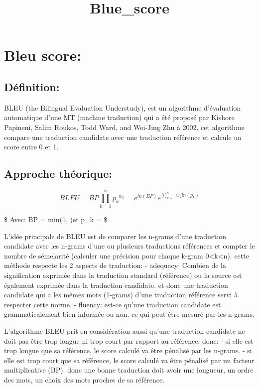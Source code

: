 \documentclass[11pt]{article}
\title{Blue\_score}
\begin{document}
    
    
    \maketitle
    
    

    
    \section{Bleu score:}\label{bleu-score}

\subsection{Définition:}\label{duxe9finition}

BLEU (the Bilingual Evaluation Understudy), est un algorithme
d'évaluation automatique d'une MT (machine traduction) qui a été proposé
par Kishore Papineni, Salim Roukos, Todd Ward, and Wei-Jing Zhu à 2002,
cet algorithme compare une traduction candidate avec une traduction
référence et calcule un score entre 0 et 1.

\subsection{Approche théorique:}\label{approche-thuxe9orique}

\begin{equation*}
BLEU = BP\prod_{k=1}^{n}{p_k}^{w_k}=e^{ln(BP)}e^{\sum^{n}_{k=1}w_kln(p_k)}
\end{equation*}

\$ Avec: BP = min(1,
)\quad et \quad p\_k =
 \$

L'idée principale de BLEU est de comparer les n-grams d'une traduction
candidate avec les n-grams d'une ou plusieurs traductions références et
compter le nombre de sémelarité (calculer une précision pour chaque
k-gram 0\textless{}k\textless{}n). cette méthode respecte les 2 aspects
de traduction: - adequacy: Combien de la signification exprimée dans la
traduction standard (référence) ou la source est également exprimée dans
la traduction candidate. et donc une traduction candidate qui a les
mêmes mots (1-grams) d'une traduction référence servi à respecter cette
norme. - fluency: est-ce qu'une traduction candidate est
grammaticalement bien informée ou non. ce qui peut être mesuré par les
n-grams.

L'algorithme BLEU prit en considération aussi qu'une traduction
candidate ne doit pas être trop longue ni trop court par rapport au
référence. donc: - si elle est trop longue que sa référence, le score
calculé va être pénalisé par les n-grams. - si elle est trop court que
sa référence, le score calculé va être pénalisé par un facteur
multiplicative (BP). donc une bonne traduction doit avoir une longueur,
un ordre des mots, un choix des mots proches de sa référence.
\end{document}
